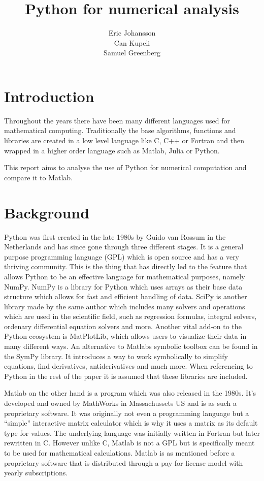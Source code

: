 \documentclass{article}
\title{Python for numerical analysis}
\author{Eric Johansson\\Can Kupeli\\Samuel Greenberg}
\begin{document}
\maketitle
\newpage



\section{Introduction}%
\label{sec:introduction}
Throughout the years there have been many different languages used for mathematical computing.
Traditionally the base algorithms, functions and libraries are created in a low level language like C, C++ or Fortran and then wrapped
in a higher order language such as Matlab, Julia or Python.

This report aims to analyse the use of Python for numerical computation and compare it to Matlab.

\section{Background}%
\label{sec:background}

Python was first created in the late 1980s by Guido van Rossum in the Netherlands and has since gone through three different stages.
It is a general purpose programming language (GPL) which is open source and has a very thriving community. This is the thing that has
directly led to the feature that allows Python to be an effective language for mathematical purposes, namely NumPy.
NumPy is a library for Python which uses arrays as their base data structure which allows for fast and efficient handling of data.
SciPy is another library made by the same author which includes many solvers and operations which are used in the scientific field, such
as regression formulas, integral solvers, ordenary differential equation solvers and more.
Another vital add-on to the Python ecosystem is MatPlotLib, which allows users to visualize their data in many different ways.
An alternative to Matlabs symbolic toolbox can be found in the SymPy library. It introduces a way to work symbolically to simplify
equations, find derivatives, antiderivatives and much more. When referencing to Python in the rest of the paper it is assumed that these
libraries are included.

Matlab on the other hand is a program which was also released in the 1980s. It's developed and owned by MathWorks in Massachussets US and
is as such a proprietary software. It was originally not even a programming language but a ``simple'' interactive matrix calculator which
is why it uses a matrix as its default type for values. The underlying language was initially written in Fortran but later rewritten
in C. However unlike C, Matlab is not a GPL but is specifically meant to be used for mathematical calculations. Matlab is as mentioned before a proprietary software that is distributed through a pay for license model with yearly subscriptions.
\end{document}
